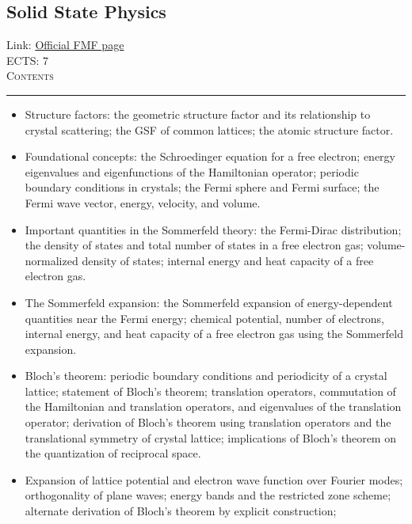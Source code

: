 \documentclass[11pt, a4paper]{article}
\newenvironment{course}[3]{
\subsection{#1}%
Link: \href{#2}{Official FMF page}\\%
ECTS: #3%
\vspace{1ex}
\\
{\large \textsc{Contents}}\\[-0.9ex]%
\rule{\textwidth}{0.5pt}
\vspace{-3ex}
}
{}
\newenvironment{chapter}[1]{
\begin{tcolorbox}[title=#1, breakable]
}
{\end{tcolorbox}}
\begin{document}
\begin{course}{Solid State Physics}{https://www.fmf.uni-lj.si/en/study-physics/programmes/1fiz/2020/7000777/courses/1138/}{7}
\begin{chapter}{Crystal structure}
\begin{itemize}
            \item Structure factors: the geometric structure factor and its relationship to crystal scattering; the GSF of common lattices; the atomic structure factor.

        \end{itemize}
    \end{chapter}

    \begin{chapter}{The Sommerfeld theory of free electrons}
        \begin{itemize}
        
            \item Foundational concepts: the Schroedinger equation for a free electron; energy eigenvalues and eigenfunctions of the Hamiltonian operator; periodic boundary conditions in crystals; the Fermi sphere and Fermi surface; the Fermi wave vector, energy, velocity, and volume.

            \item Important quantities in the Sommerfeld theory: the Fermi-Dirac distribution; the density of states and total number of states in a free electron gas; volume-normalized density of states; internal energy and heat capacity of a free electron gas.

            \item The Sommerfeld expansion: the Sommerfeld expansion of energy-dependent quantities near the Fermi energy; chemical potential, number of electrons, internal energy, and heat capacity of a free electron gas using the Sommerfeld expansion.
        
        \end{itemize}
    \end{chapter}

    \begin{chapter}{Electron states in a periodic potential}
        \begin{itemize}
        
            \item Bloch's theorem: periodic boundary conditions and periodicity of a crystal lattice; statement of Bloch's theorem; translation operators, commutation of the Hamiltonian and translation operators, and eigenvalues of the translation operator;
            derivation of Bloch's theorem using translation operators and the translational symmetry of crystal lattice; implications of Bloch's theorem on the quantization of reciprocal space.

            \item Expansion of lattice potential and electron wave function over Fourier modes; orthogonality of plane waves; energy bands and the restricted zone scheme; alternate derivation of Bloch's theorem by explicit construction;


\end{itemize}
\end{chapter}
\end{course}
\end{document}
